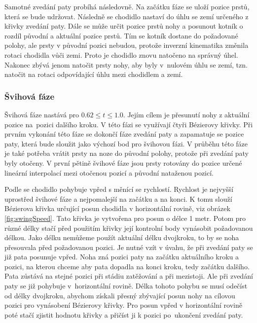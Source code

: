 Samotné zvedání paty probíhá následovně. Na začátku fáze se uloží pozice prstů, která se bude udržovat. Následně se chodidlo nastaví do úhlu se zemí určeného z křivky zvedání paty. Dále se může určit pozice prstů nohy a posunout kotník o rozdíl původní a aktuální pozice prstů. Tím se kotník dostane do požadované polohy, ale prsty v původní pozici nebudou, protože inverzní kinematika změnila rotaci chodidla vůči zemi. Proto je chodidlo znovu natočeno na správný úhel. Nakonec zbývá jenom natočit prsty nohy, aby byly v~nulovém úhlu se zemí, tzn. natočit na rotaci odpovídající úhlu mezi chodidlem a zemí.

\subsubsection{Švihová fáze}
Švihová fáze nastává pro $0.62 \leq t \leq 1.0$. Jejím cílem je přesunutí nohy z aktuální pozice na~pozici dalšího kroku. V této fázi se využívají čtyři Bézierovy křivky. Při prvním vykonání této fáze se dokončí fáze zvedání paty a zapamatuje se pozice paty, která bude sloužit jako výchozí bod pro švihovou fázi. V průběhu této fáze je také potřeba vrátit prsty na noze do původní polohy, protože při zvedání paty byly otočeny. V první pětině švihové fáze jsou prsty rotovány do pozice určené lineární interpolací mezi otočenou pozicí a původní nataženou pozicí.

Podle \cite{chung} se chodidlo pohybuje vpřed s měnící se rychlostí.  Rychlost je nejvyšší uprostřed švihové fáze a nejpomalejší na začátku a na konci. K tomu slouží Bézierova křivka určující posun chodidla v horizontální rovině, viz obrázek \ref{fig:swingSpeed}. Tato křivka je vytvořena pro posun o délce 1 metr. Potom pro různé délky stačí před použitím křivky její kontrolní body vynásobit požadovanou délkou. Jako délku nemůžeme použít aktuální délku dvojkroku, to by se noha přesouvala před požadovanou pozici. Je nutné vzít v úvahu, že při zvedání paty se již  pata posunuje vpřed. Noha zná pozici paty na začátku aktuálního kroku a pozici, na kterou chceme aby pata dopadla na konci kroku, tedy začátku dalšího. Pata zůstává na stejné pozici při stádiu zatěžování a při mezistoji. Ale při zvedání paty se již pohybuje v~horizontální rovině. Délka tohoto pohybu se musí odečíst od délky dvojkroku, abychom získali přesný zbývající posun nohy na cílovou pozici pro vynásobení Bézierovy křivky. Pro posun vpřed v horizontální rovině poté stačí zjistit hodnotu křivky a přičíst ji k pozici po~ukončení zvedání paty.

